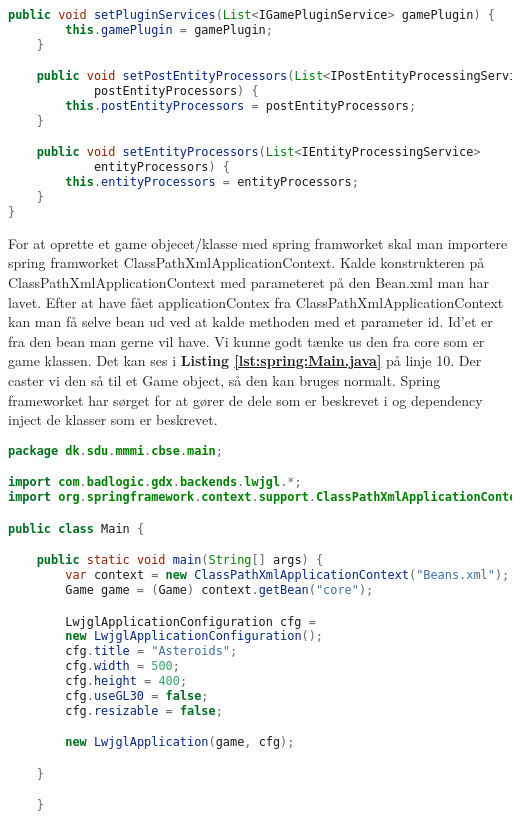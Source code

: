 \begin{lstlisting}[caption={dk.sdu.mmmi.cbse.main.Game.java}, label={lst:spring:Game.java.2}, language=java, firstnumber=109]
    public void setPluginServices(List<IGamePluginService> gamePlugin) {
        this.gamePlugin = gamePlugin;
    }

    public void setPostEntityProcessors(List<IPostEntityProcessingService> 
            postEntityProcessors) {
        this.postEntityProcessors = postEntityProcessors;
    }

    public void setEntityProcessors(List<IEntityProcessingService> 
            entityProcessors) {
        this.entityProcessors = entityProcessors;
    }
}
\end{lstlisting}


For at oprette et game objecet/klasse med spring framworket skal man importere
spring framworket ClassPathXmlApplicationContext. Kalde konstrukteren på
ClassPathXmlApplicationContext med parameteret på den Bean.xml man har lavet.
Efter at have fået applicationContex fra ClassPathXmlApplicationContext kan man
få selve bean ud ved at kalde methoden  med et parameter id.
Id'et er fra den bean man gerne vil have. Vi kunne godt tænke us den fra core
som er game klassen. Det kan ses i \textbf{Listing \ref{lst:spring:Main.java}} på linje
10. Der caster vi den så til et Game object, så den kan bruges normalt.
Spring frameworket har sørget for at gører de dele som er beskrevet i
 og dependency inject de klasser som er beskrevet.


\begin{lstlisting}[caption={dk.sdu.mmmi.cbse.main.Main.java}, label={lst:spring:Main.java}, language=java, firstnumber=1]
package dk.sdu.mmmi.cbse.main;

import com.badlogic.gdx.backends.lwjgl.*;
import org.springframework.context.support.ClassPathXmlApplicationContext;

public class Main {

    public static void main(String[] args) {
        var context = new ClassPathXmlApplicationContext("Beans.xml");
        Game game = (Game) context.getBean("core");

        LwjglApplicationConfiguration cfg =
        new LwjglApplicationConfiguration();
        cfg.title = "Asteroids";
        cfg.width = 500;
        cfg.height = 400;
        cfg.useGL30 = false;
        cfg.resizable = false;

        new LwjglApplication(game, cfg);

    }

    }
\end{lstlisting}
